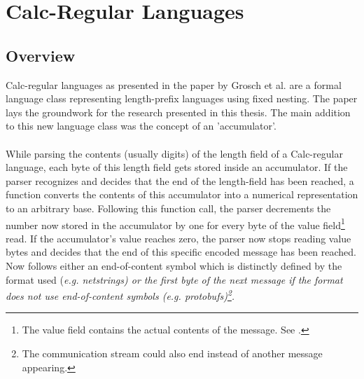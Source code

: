 \section{Calc-Regular Languages}
\label{2.0}
\subsection{Overview}
\label{2.1}
Calc-regular languages as presented in the paper by Grosch et al. \cite{Calc-regular-paper} are a formal language class representing length-prefix languages using fixed nesting. The paper lays the groundwork for the research presented in this thesis. The main addition to this new language class was the concept of an 'accumulator'.\\\\ While parsing the contents (usually digits) of the length field of a Calc-regular language, each byte of this length field gets stored inside an accumulator. If the parser recognizes and decides that the end of the length-field has been reached, a function converts the contents of this accumulator into a numerical representation to an arbitrary base. Following this function call, the parser decrements the number now stored in the accumulator by one for every byte of the value field\footnote{The value field contains the actual contents of the message. See \cite{Type-Length-Value}.} read. If the accumulator's value reaches zero, the parser now stops reading value bytes and decides that the end of this specific encoded message has been reached. Now follows either an end-of-content symbol which is distinctly defined by the format used (\em e.g. \em  netstrings) or the first byte of the next message if the format does not use end-of-content symbols (\em e.g. \em protobufs)\footnote{The communication stream could also end instead of another message appearing.}. 
